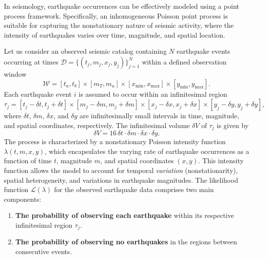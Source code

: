 \documentclass[extra,mreferee]{gji}
\theoremstyle{lemma}
\begin{document}
In seismology, earthquake occurrences can be effectively modeled using a point process framework. Specifically, an inhomogeneous Poisson point process is suitable for capturing the nonstationary nature of seismic activity, where the intensity of earthquakes varies over time, magnitude, and spatial location.

Let us consider an observed seismic catalog containing \( N \) earthquake events occurring at times \( \mathcal{D} = \{(t_j, m_j, x_j, y_j)\}_{j=1}^N \) within a defined observation window
\[
\mathcal{W} = [t_a, t_b] \times [m_T, m_u] \times [x_{\mathrm{min}}, x_{\mathrm{max}}] \times [y_{\mathrm{min}}, y_{\mathrm{max}}].
\]
Each earthquake event \( i \) is assumed to occur within an infinitesimal region
\[
\tau_j = [t_j - \delta t, t_j + \delta t] \times [m_j - \delta m, m_j + \delta m] \times [x_j - \delta x, x_j + \delta x] \times [y_j - \delta y, y_j + \delta y],
\]
where \( \delta t \), \( \delta m \), \( \delta x \), and \( \delta y \) are infinitesimally small intervals in time, magnitude, and spatial coordinates, respectively. The infinitesimal volume \( \delta V \) of \( \tau_j \) is given by
\[
\delta V = 16 \,\delta t \cdot \delta m \cdot \delta x \cdot \delta y.
\]
The process is characterized by a nonstationary Poisson intensity function \( \lambda(t, m, x, y) \), which encapsulates the varying rate of earthquake occurrences as a function of time \( t \), magnitude \( m \), and spatial coordinates \( (x, y) \). This intensity function allows the model to account for temporal \textit{variation} (nonstationarity), spatial heterogeneity, and variations in earthquake magnitudes. The likelihood function \( \mathcal{L}(\lambda) \) for the observed earthquake data comprises two main components:
\begin{enumerate}
    \item \textbf{The probability of observing each earthquake} within its respective infinitesimal region \( \tau_j \).
    \item \textbf{The probability of observing no earthquakes} in the regions between consecutive events.
\end{enumerate}
\end{document}
